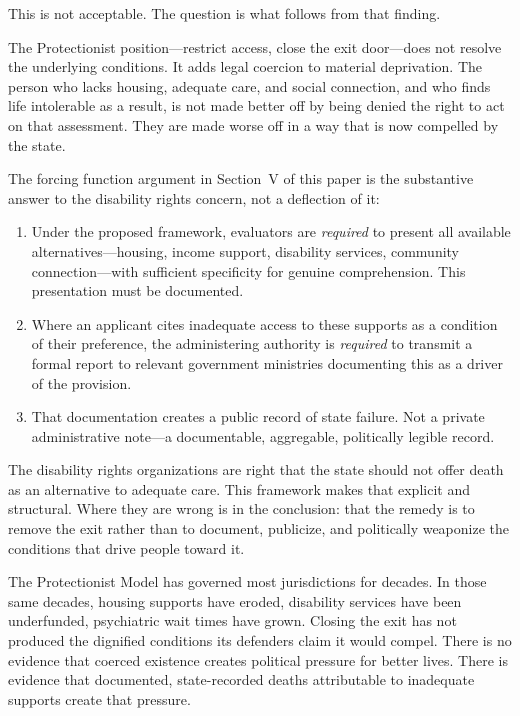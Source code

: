 \documentclass[11pt, letterpaper]{article}
\begin{document}
This is not acceptable. The question is what follows from that finding.

The Protectionist position---restrict access, close the exit door---does not resolve the
underlying conditions. It adds legal coercion to material deprivation. The person who lacks
housing, adequate care, and social connection, and who finds life intolerable as a result,
is not made better off by being denied the right to act on that assessment. They are made
worse off in a way that is now compelled by the state.

The forcing function argument in Section~V of this paper is the substantive answer to the
disability rights concern, not a deflection of it:

\begin{enumerate}
  \item Under the proposed framework, evaluators are \emph{required} to present all available
    alternatives---housing, income support, disability services, community connection---with
    sufficient specificity for genuine comprehension. This presentation must be documented.
  \item Where an applicant cites inadequate access to these supports as a condition of their
    preference, the administering authority is \emph{required} to transmit a formal report
    to relevant government ministries documenting this as a driver of the provision.
  \item That documentation creates a public record of state failure. Not a private administrative
    note---a documentable, aggregable, politically legible record.
\end{enumerate}

The disability rights organizations are right that the state should not offer death as an
alternative to adequate care. This framework makes that explicit and structural. Where they
are wrong is in the conclusion: that the remedy is to remove the exit rather than to document,
publicize, and politically weaponize the conditions that drive people toward it.

The Protectionist Model has governed most jurisdictions for decades. In those same decades,
housing supports have eroded, disability services have been underfunded, psychiatric wait
times have grown. Closing the exit has not produced the dignified conditions its defenders
claim it would compel. There is no evidence that coerced existence creates political pressure
for better lives. There is evidence that documented, state-recorded deaths attributable to
inadequate supports create that pressure.
\end{document}
